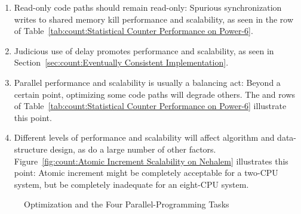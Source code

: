 \begin{lineref}
\begin{enumerate}
\begin{enumerate}
\item	Read-only code paths should remain read-only:  Spurious
	synchronization writes to shared memory kill performance
	and scalability, as seen in the  row of
	Table~\ref{tab:count:Statistical Counter Performance on Power-6}.
\item	Judicious use of delay promotes performance and scalability, as
	seen in Section~\ref{sec:count:Eventually Consistent Implementation}.
\item	Parallel performance and scalability is usually a balancing act:
	Beyond a certain point, optimizing some code paths will degrade
	others.
	The  and  rows of
	Table~\ref{tab:count:Statistical Counter Performance on Power-6}
	illustrate this point.
\item	Different levels of performance and scalability will affect
	algorithm and data-structure design, as do a large number of
	other factors.
	Figure~\ref{fig:count:Atomic Increment Scalability on Nehalem}
	illustrates this point:  Atomic increment might be completely
	acceptable for a two-CPU system, but be completely inadequate for an
	eight-CPU system.
\fi
\end{enumerate}

\begin{figure}[tb]
\centering
{}
\caption{Optimization and the Four Parallel-Programming Tasks}
\label{fig:count:Optimization and the Four Parallel-Programming Tasks}
\end{figure}


\end{enumerate}
\end{lineref}
